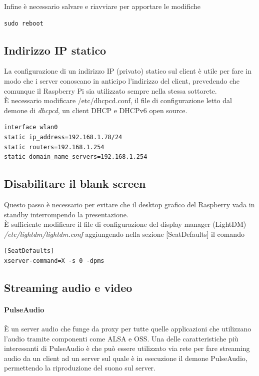\noindent Infine è necessario salvare e riavviare per apportare le modifiche
\begin{lstlisting}
sudo reboot
\end{lstlisting}

\subsection{Indirizzo IP statico}
La configurazione di un indirizzo IP (privato) statico sul client è utile per fare in modo che i server conoscano in anticipo l'indirizzo del client, prevedendo che comunque il Raspberry Pi sia utilizzato sempre nella stessa sottorete.\\
È necessario modificare /etc/dhcpcd.conf, il file di configurazione letto dal demone di \textit{dhcpcd}, un client DHCP e DHCPv6 open source.

\begin{lstlisting}
interface wlan0
static ip_address=192.168.1.78/24
static routers=192.168.1.254
static domain_name_servers=192.168.1.254

\end{lstlisting}

\subsection{Disabilitare il blank screen}
Questo passo è necessario per evitare che il desktop grafico del Raspberry vada in standby interrompendo la presentazione. \\
È sufficiente modificare il file di configurazione del display manager (LightDM) \textit{/etc/lightdm/lightdm.conf} aggiungendo nella sezione [SeatDefaults] il comando
\begin{lstlisting}
[SeatDefaults]
xserver-command=X -s 0 -dpms
\end{lstlisting}

\subsection{Streaming audio e video}

\paragraph*{PulseAudio}
È un server audio che funge da proxy per tutte quelle applicazioni che utilizzano l'audio tramite componenti come ALSA e OSS.
Una delle caratteristiche più interessanti di PulseAudio è che può essere utilizzato via rete per fare streaming audio da un client ad un server sul quale è in esecuzione il demone PulseAudio, permettendo la riproduzione del suono sul server.\\

